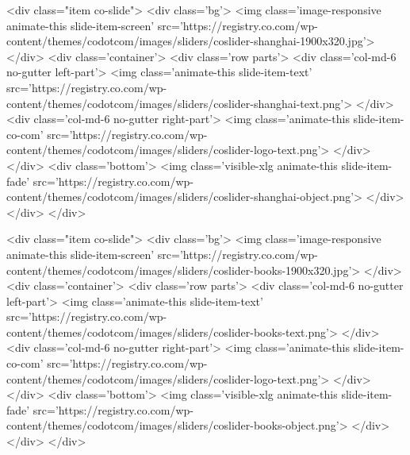                 <div class="item co-slide">
                    <div class='bg'>
                        <img class='image-responsive animate-this slide-item-screen' src='https://registry.co.com/wp-content/themes/codotcom/images/sliders/coslider-shanghai-1900x320.jpg'>
                    </div>
                    <div class='container'>
                        <div class='row parts'>
                            <div class='col-md-6 no-gutter left-part'>
                                <img class='animate-this slide-item-text' src='https://registry.co.com/wp-content/themes/codotcom/images/sliders/coslider-shanghai-text.png'>
                            </div>
                            <div class='col-md-6 no-gutter right-part'>
                                <img class='animate-this slide-item-co-com' src='https://registry.co.com/wp-content/themes/codotcom/images/sliders/coslider-logo-text.png'>
                            </div>
                        </div>
                        <div class='bottom'>
                            <img class='visible-xlg animate-this slide-item-fade' src='https://registry.co.com/wp-content/themes/codotcom/images/sliders/coslider-shanghai-object.png'>
                        </div>
                    </div>
                </div>

                <div class="item co-slide">
                    <div class='bg'>
                        <img class='image-responsive animate-this slide-item-screen' src='https://registry.co.com/wp-content/themes/codotcom/images/sliders/coslider-books-1900x320.jpg'>
                    </div>
                    <div class='container'>
                        <div class='row parts'>
                            <div class='col-md-6 no-gutter left-part'>
                                <img class='animate-this slide-item-text' src='https://registry.co.com/wp-content/themes/codotcom/images/sliders/coslider-books-text.png'>
                            </div>
                            <div class='col-md-6 no-gutter right-part'>
                                <img class='animate-this slide-item-co-com' src='https://registry.co.com/wp-content/themes/codotcom/images/sliders/coslider-logo-text.png'>
                            </div>
                        </div>
                        <div class='bottom'>
                            <img class='visible-xlg animate-this slide-item-fade' src='https://registry.co.com/wp-content/themes/codotcom/images/sliders/coslider-books-object.png'>
                        </div>
                    </div>
                </div>

